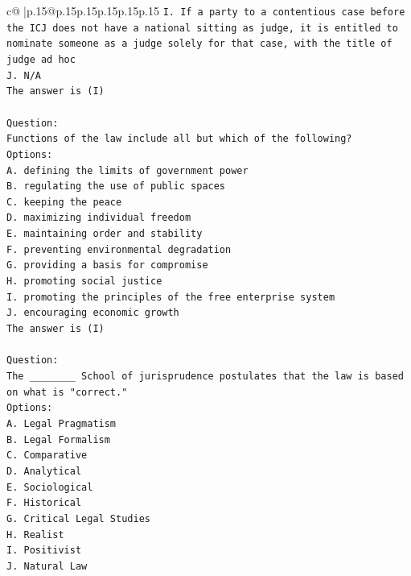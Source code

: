 \documentclass{article}
\begin{document}
{\begin{supertabular}{c@{$\;$}|p{.15\linewidth}@{}p{.15\linewidth}p{.15\linewidth}p{.15\linewidth}p{.15\linewidth}p{.15\linewidth}}
{{{\texttt{I. If a party to a contentious case before the ICJ does not have a national sitting as judge, it is entitled to nominate someone as a judge solely for that case, with the title of judge ad hoc} \\
\texttt{J. N/A} \\
\texttt{The answer is (I)} \\
\\ 
\texttt{Question:} \\
\texttt{Functions of the law include all but which of the following?} \\
\texttt{Options:} \\
\texttt{A. defining the limits of government power} \\
\texttt{B. regulating the use of public spaces} \\
\texttt{C. keeping the peace} \\
\texttt{D. maximizing individual freedom} \\
\texttt{E. maintaining order and stability} \\
\texttt{F. preventing environmental degradation} \\
\texttt{G. providing a basis for compromise} \\
\texttt{H. promoting social justice} \\
\texttt{I. promoting the principles of the free enterprise system} \\
\texttt{J. encouraging economic growth} \\
\texttt{The answer is (I)} \\
\\ 
\texttt{Question:} \\
\texttt{The \_\_\_\_\_\_\_\_ School of jurisprudence postulates that the law is based on what is "correct."} \\
\texttt{Options:} \\
\texttt{A. Legal Pragmatism} \\
\texttt{B. Legal Formalism} \\
\texttt{C. Comparative} \\
\texttt{D. Analytical} \\
\texttt{E. Sociological} \\
\texttt{F. Historical} \\
\texttt{G. Critical Legal Studies} \\
\texttt{H. Realist} \\
\texttt{I. Positivist} \\
\texttt{J. Natural Law} \\
}}}
\end{supertabular}}
\end{document}
